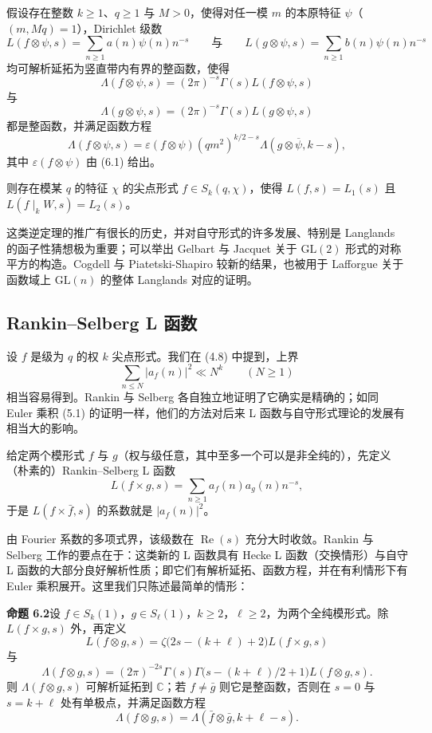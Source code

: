假设存在整数 $k\ge1$、$q\ge1$ 与 $M>0$，使得对任一模 $m$ 的本原特征 $\psi$（$(m,Mq)=1$），Dirichlet 级数
\[
L(f\otimes\psi,s)=\sum_{n\ge1}a(n)\psi(n)n^{-s}\qquad\text{与}\qquad L(g\otimes\psi,s)=\sum_{n\ge1}b(n)\psi(n)n^{-s}
\]
均可解析延拓为竖直带内有界的整函数，使得
\[
\Lambda(f\otimes\psi,s)=(2\pi)^{-s}\Gamma(s)L(f\otimes\psi,s)
\]
与
\[
\Lambda(g\otimes\psi,s)=(2\pi)^{-s}\Gamma(s)L(g\otimes\psi,s)
\]
都是整函数，并满足函数方程
\[
\Lambda(f\otimes\psi,s)=\varepsilon(f\otimes\psi)(qm^{2})^{k/2-s}\Lambda(g\otimes\overline{\psi},k-s),
\]
其中 $\varepsilon(f\otimes\psi)$ 由 (6.1) 给出。

则存在模某 $q$ 的特征 $\chi$ 的尖点形式 $f\in S_{k}(q,\chi)$，使得 $L(f,s)=L_{1}(s)$ 且 $L(f\mid_{k}W,s)=L_{2}(s)$。

这类逆定理的推广有很长的历史，并对自守形式的许多发展、特别是 Langlands 的函子性猜想极为重要；可以举出 Gelbart 与 Jacquet 关于 $\mathrm{GL}(2)$ 形式的对称平方的构造。Cogdell 与 Piatetski-Shapiro 较新的结果，也被用于 Lafforgue 关于函数域上 $\mathrm{GL}(n)$ 的整体 Langlands 对应的证明。

\subsection{Rankin--Selberg L 函数}\label{c3:sec:6.2}

设 $f$ 是级为 $q$ 的权 $k$ 尖点形式。我们在 (4.8) 中提到，上界
\[
\sum_{n\le N}|a_{f}(n)|^{2}\ll N^{k}\qquad(N\ge1)
\]
相当容易得到。Rankin 与 Selberg 各自独立地证明了它确实是精确的；如同 Euler 乘积 (5.1) 的证明一样，他们的方法对后来 L 函数与自守形式理论的发展有相当大的影响。

给定两个模形式 $f$ 与 $g$（权与级任意，其中至多一个可以是非全纯的），先定义（朴素的）Rankin--Selberg L 函数
\[
L(f\times g,s)=\sum_{n\ge1}a_{f}(n)a_{g}(n)n^{-s},
\]
于是 $L(f\times\bar f,s)$ 的系数就是 $|a_{f}(n)|^{2}$。

由 Fourier 系数的多项式界，该级数在 $\operatorname{Re}(s)$ 充分大时收敛。Rankin 与 Selberg 工作的要点在于：这类新的 L 函数具有 Hecke L 函数（交换情形）与自守 L 函数的大部分良好解析性质；即它们有解析延拓、函数方程，并在有利情形下有 Euler 乘积展开。这里我们只陈述最简单的情形：

\par\medskip\noindent\textbf{命题 6.2}\quad 设 $f\in S_{k}(1)$，$g\in S_{\ell}(1)$，$k\ge2$，$\ell\ge2$，为两个全纯模形式。除 $L(f\times g,s)$ 外，再定义
\[
L(f\otimes g,s)=\zeta\bigl(2s-(k+\ell)+2\bigr)L(f\times g,s)
\]
与
\[
\Lambda(f\otimes g,s)=(2\pi)^{-2s}\Gamma(s)\Gamma\bigl(s-(k+\ell)/2+1\bigr)L(f\otimes g,s).
\]
则 $\Lambda(f\otimes g,s)$ 可解析延拓到 $\mathbb{C}$；若 $f\ne\bar g$ 则它是整函数，否则在 $s=0$ 与 $s=k+\ell$ 处有单极点，并满足函数方程
\[
\Lambda(f\otimes g,s)=\Lambda(\bar f\otimes\bar g,k+\ell-s).
\]

